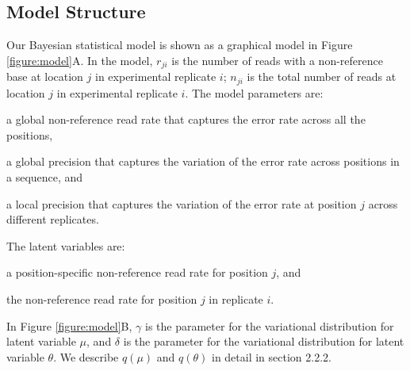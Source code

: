 \documentclass{bmcart}
\begin{document}
\subsection{Model Structure}
Our Bayesian statistical model is shown as a graphical model in Figure \ref{figure:model}A.
In the model, $r_{ji}$ is the number of reads with a non-reference base at location $j$ in experimental replicate $i$; $n_{ji}$ is the total number of reads at location $j$ in experimental replicate $i$.
The model parameters are:
\begin{description}[noitemsep]
  \item[$- \ \mu_0$] a global non-reference read rate that captures the error rate across all the positions,
  \item[$- \ M_0$] a global precision that captures the variation of the error rate across positions in a sequence, and
  \item[$- \ M_j$] a local precision that captures the variation of the error rate at position $j$ across different replicates.
\end{description}
The latent variables are:
\begin{description}[noitemsep]
  \item[$- \ \mu_j \sim \text{Beta}(\mu_0, M_0)$] a position-specific non-reference read rate for position $j$, and
  \item[$- \ \theta_{ji} \sim \text{Beta}(\mu_j, M_j)$] the non-reference read rate for position $j$ in replicate $i$.
\end{description}

In Figure \ref{figure:model}B, $\gamma$ is the parameter for the variational distribution for latent variable $\mu$,
and $\delta$ is the parameter for the variational distribution for latent variable $\theta$.
We describe $q(\mu)$ and $q(\theta)$ in detail in section 2.2.2.

\end{document}
